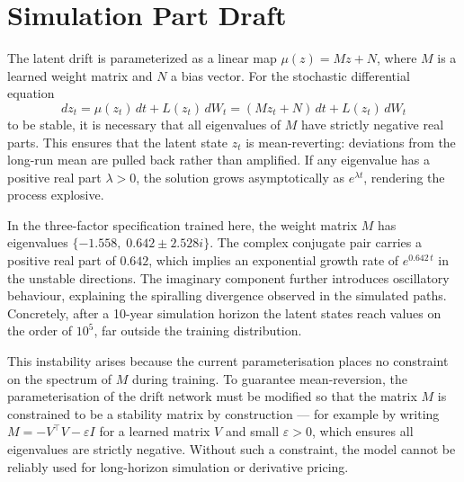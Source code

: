 \chapter{Simulation Part Draft}



The latent drift is parameterized as a linear map $\mu(z) = Mz + N$, where $M$ is a learned weight matrix and $N$ a bias vector. For the stochastic differential equation
$$
dz_t = \mu(z_t)\,dt + L(z_t)\,dW_t = (Mz_t + N)\,dt + L(z_t)\,dW_t
$$
to be stable, it is necessary that all eigenvalues of $M$ have strictly negative real parts. This ensures that the latent state $z_t$ is mean-reverting: deviations from the long-run mean are pulled back rather than amplified. If any eigenvalue has a positive real part $\lambda > 0$, the solution grows asymptotically as $e^{\lambda t}$, rendering the process explosive.

In the three-factor specification trained here, the weight matrix $M$ has eigenvalues $\{-1.558,\; 0.642 \pm 2.528i\}$. The complex conjugate pair carries a positive real part of $0.642$, which implies an exponential growth rate of $e^{0.642\,t}$ in the unstable directions. The imaginary component further introduces oscillatory behaviour, explaining the spiralling divergence observed in the simulated paths. Concretely, after a 10-year simulation horizon the latent states reach values on the order of $10^5$, far outside the training distribution.

This instability arises because the current parameterisation places no constraint on the spectrum of $M$ during training. To guarantee mean-reversion, the parameterisation of the drift network must be modified so that the matrix $M$ is constrained to be a stability matrix by construction — for example by writing $M = -V^\top V - \varepsilon I$ for a learned matrix $V$ and small $\varepsilon > 0$, which ensures all eigenvalues are strictly negative. Without such a constraint, the model cannot be reliably used for long-horizon simulation or derivative pricing.

